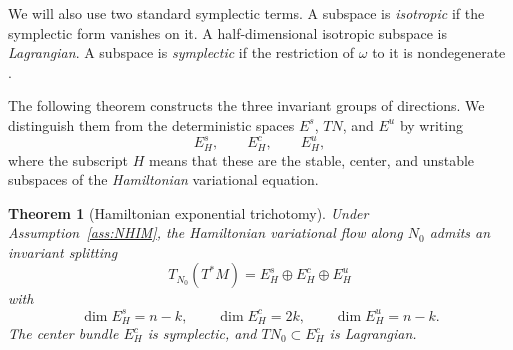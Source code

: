 \documentclass[11pt]{article}
\newtheorem{theorem}{Theorem}[section]
\theoremstyle{definition}
\theoremstyle{remark}
\begin{document}
We will also use two standard symplectic terms.  A subspace is \emph{isotropic} if the symplectic form vanishes on it.  A half-dimensional isotropic subspace is \emph{Lagrangian}.  A subspace is \emph{symplectic} if the restriction of $\omega$ to it is nondegenerate \cite{MarsdenRatiu1999}.

The following theorem constructs the three invariant groups of directions.  We distinguish them from the deterministic spaces $E^s$, $TN$, and $E^u$ by writing
\[
E_H^s,\qquad E_H^c,\qquad E_H^u,
\]
where the subscript $H$ means that these are the stable, center, and unstable subspaces of the \emph{Hamiltonian} variational equation.

\begin{theorem}[Hamiltonian exponential trichotomy]
\label{thm:trichotomy}
Under Assumption~\ref{ass:NHIM}, the Hamiltonian variational flow along $N_0$ admits an invariant splitting
\begin{equation}
T_{N_0}(T^*M)=E_H^s\oplus E_H^c\oplus E_H^u
\label{eq:H-splitting}
\end{equation}
with
\begin{equation}
\dim E_H^s=n-k,
\qquad
\dim E_H^c=2k,
\qquad
\dim E_H^u=n-k.
\label{eq:H-dimensions}
\end{equation}
The center bundle $E_H^c$ is symplectic, and $TN_0\subset E_H^c$ is Lagrangian.
\end{theorem}
\end{document}
